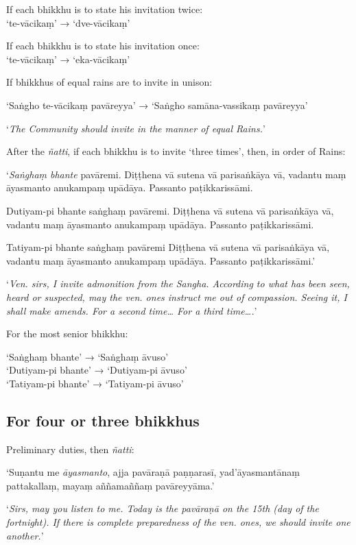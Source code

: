 If each bhikkhu is to state his invitation twice:\\
‘te-vācikaṃ’ → ‘dve-vācikaṃ’

If each bhikkhu is to state his invitation once:\\
‘te-vācikaṃ’ → ‘eka-vācikaṃ’

If bhikkhus of equal rains are to invite in unison:

‘Saṅgho te-vācikaṃ pavāreyya’ → ‘Saṅgho samāna-vassikaṃ pavāreyya’

‘\emph{The Community should invite in the manner of equal Rains.}’

After the \emph{ñatti}, if each bhikkhu is to invite ‘three times’, then, in
order of Rains:

‘\emph{Saṅghaṃ bhante} pavāremi. Diṭṭhena vā sutena vā parisaṅkāya vā, vadantu
maṃ āyasmanto anukampaṃ upādāya. Passanto paṭikkarissāmi.

Dutiyam-pi bhante saṅghaṃ pavāremi. Diṭṭhena vā sutena vā parisaṅkāya vā,
vadantu maṃ āyasmanto anukampaṃ upādāya. Passanto paṭikkarissāmi.

Tatiyam-pi bhante saṅghaṃ pavāremi Diṭṭhena vā sutena vā parisaṅkāya vā, vadantu
maṃ āyasmanto anukampaṃ upādāya. Passanto paṭikkarissāmi.’

‘\emph{Ven. sirs, I invite admonition from the Sangha. According to what has
  been seen, heard or suspected, may the ven. ones instruct me out of
  compassion. Seeing it, I shall make amends. For a second time… For a third
  time….}’

For the most senior bhikkhu:

‘Saṅghaṃ bhante’ → ‘Saṅghaṃ āvuso’\\
‘Dutiyam-pi bhante’ → ‘Dutiyam-pi āvuso’\\
‘Tatiyam-pi bhante’ → ‘Tatiyam-pi āvuso’

\subsection{For four or three bhikkhus}

Preliminary duties, then \emph{ñatti}:

‘Suṇantu me \emph{āyasmanto}, ajja pavāraṇā paṇṇarasī, yad'āyasmantānaṃ
pattakallaṃ, mayaṃ aññamaññaṃ pavāreyyāma.’

‘\emph{Sirs, may you listen to me. Today is the pavāraṇā on the 15th (day of the
fortnight). If there is complete preparedness of the ven. ones, we should
invite one another.}’


